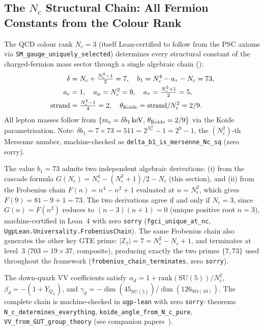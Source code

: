 \documentclass[11pt]{article}
\theoremstyle{remark}
\begin{document}
\subsection{The $N_c$ Structural Chain: All Fermion Constants from the Colour Rank}
\label{subsec:nc_chain}

The QCD colour rank $N_c = 3$ (itself Lean-certified to follow from the PSC axioms via \texttt{SM\_gauge\_uniquely\_selected}) determines every structural constant of the charged-fermion mass sector through a single algebraic chain ():
\begin{align*}
  \delta &= N_c + \tfrac{N_c^2-1}{2} = 7, \quad
  b_1 = N_c^4 - a_\tau - N_c = 73, \\
  a_e &= 1,\quad a_\mu = N_c^2 = 9,\quad a_\tau = \tfrac{N_c^2+1}{2} = 5, \\
  \text{strand} &= \tfrac{N_c^2-1}{4} = 2, \quad
  \theta_{\rm Koide} = \text{strand}/N_c^2 = 2/9.
\end{align*}
All lepton masses follow from $\{m_e = \delta b_1\,\text{keV},\, \theta_{\rm Koide} = 2/9\}$ via the Koide parametrisation. Note: $\delta b_1 = 7 \times 73 = 511 = 2^{N_c^2}-1 = 2^9-1$, the $(N_c^2)$-th Mersenne number, machine-checked as \texttt{delta\_b1\_is\_mersenne\_Nc\_sq} (zero sorry).

\smallskip
The value $b_1 = 73$ admits two independent algebraic derivations: (i) from the cascade formula $G(N_c) = N_c^4 - (N_c^2+1)/2 - N_c$ (this section), and (ii) from the Frobenius chain $F(n) = n^4 - n^2 + 1$ evaluated at $n = N_c^2$, which gives $F(9) = 81 - 9 + 1 = 73$.  The two derivations agree if and only if $N_c = 3$, since $G(n) = F(n^2)$ reduces to $(n-3)(n+1) = 0$ (unique positive root $n = 3$), machine-certified in Lean~4 with zero \texttt{sorry} (\texttt{fgci\_unique\_at\_nc}, \texttt{UgpLean.Universality.FrobeniusChain}).  The same Frobenius chain also generates the other key GTE prime: $|\mathbb{Z}_7| = 7 = N_c^2 - N_c + 1$, and terminates at level~3 ($703 = 19 \times 37$, composite), producing exactly the two primes $\{7, 73\}$ used throughout the framework (\texttt{frobenius\_chain\_terminates}, zero \texttt{sorry}).

\smallskip
The down-quark VV coefficients satisfy $\alpha_d = 1 + \mathrm{rank}(\mathrm{SU}(5))/N_c^2$, $\beta_d = -(1 + Y_{Q_L})$, and $\gamma_d = -\dim(45_{\mathrm{SU}(5)})/\dim(126_{\mathrm{SO}(10)})$.
The complete chain is machine-checked in \texttt{ugp-lean} with zero \texttt{sorry}: theorems \texttt{N\_c\_determines\_everything}, \texttt{koide\_angle\_from\_N\_c\_pure}, \texttt{VV\_from\_GUT\_group\_theory} (see companion papers~\cite{Spivack2026_Koide,Spivack2026_CyclotomicMass}).
\end{document}
